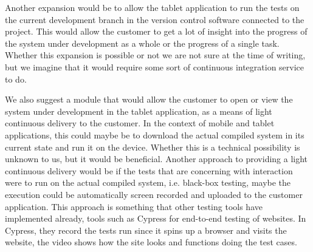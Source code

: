 Another expansion would be to allow the tablet application to run the tests on the current development branch in the version control software connected to the project.
This would allow the customer to get a lot of insight into the progress of the system under development as a whole or the progress of a single task.
Whether this expansion is possible or not we are not sure at the time of writing, but we imagine that it would require some sort of continuous integration service to do.

We also suggest a module that would allow the customer to open or view the system under development in the tablet application, as a means of light continuous delivery to the customer.
In the context of mobile and tablet applications, this could maybe be to download the actual compiled system in its current state and run it on the device. 
Whether this is a technical possibility is unknown to us, but it would be beneficial.
Another approach to providing a light continuous delivery would be if the tests that are concerning with interaction were to run on the actual compiled system, i.e. black-box testing, maybe the execution could be automatically screen recorded and uploaded to the customer application.
This approach is something that other testing tools have implemented already, tools such as Cypress for end-to-end testing of websites.
In Cypress, they record the tests run since it spins up a browser and visits the website, the video shows how the site looks and functions doing the test cases.
